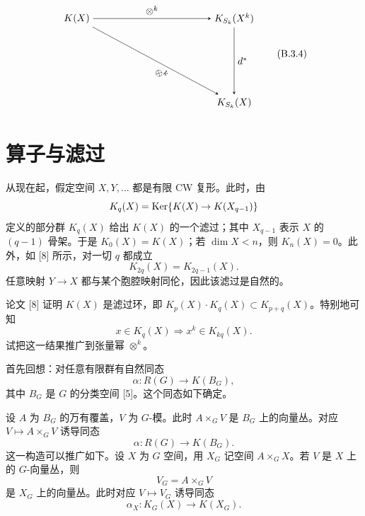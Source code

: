 \begin{equation}
  \begin{tikzpicture}[>=stealth, baseline=(current bounding box.center)]
    \node (A) at (2.0,1.5) {$K(X)$};
    \node (B) at (7.6,1.5) {$K_{S_k}(X^k)$};
    \node (C) at (7.6,-1.5) {$K_{S_k}(X)$};
    \draw[->] (A) -- node[above] {$\otimes^k$} (B);
    \draw[->] (B) -- node[right] {$d^*$} (C);
    \draw[->] (A) -- node[below, sloped, pos=0.58] {$\otimes^k$} (C);
  \end{tikzpicture}
  \tag{B.3.4}
\end{equation}

\section{算子与滤过}

从现在起，假定空间 $X,Y,\dots$ 都是有限 CW 复形。此时，由
\[
  K_q(X)=\operatorname{Ker}\{K(X)\to K(X_{q-1})\}
\]
定义的部分群 $K_q(X)$ 给出 $K(X)$ 的一个滤过；其中 $X_{q-1}$ 表示 $X$ 的 $(q-1)$ 骨架。于是 $K_0(X)=K(X)$；若 $\dim X<n$，则 $K_n(X)=0$。此外，如 [8] 所示，对一切 $q$ 都成立
\[
  K_{2q}(X)=K_{2q-1}(X).
\]
任意映射 $Y\to X$ 都与某个胞腔映射同伦，因此该滤过是自然的。


论文 [8] 证明 $K(X)$ 是滤过环，即 $K_p(X)\cdot K_q(X)\subset K_{p+q}(X)$。特别地可知
\[
  x\in K_q(X)\Rightarrow x^k\in K_{kq}(X).
\]
试把这一结果推广到张量幂 $\otimes^k$。

首先回想：对任意有限群有自然同态
\[
  \alpha\colon R(G)\to K(B_G),
\]
其中 $B_G$ 是 $G$ 的分类空间 [5]。这个同态如下确定。

设 $A$ 为 $B_G$ 的万有覆盖，$V$ 为 $G$-模。此时 $A\times_G V$ 是 $B_G$ 上的向量丛。对应 $V\mapsto A\times_G V$ 诱导同态
\[
  \alpha\colon R(G)\to K(B_G).
\]
这一构造可以推广如下。设 $X$ 为 $G$ 空间，用 $X_G$ 记空间 $A\times_G X$。若 $V$ 是 $X$ 上的 $G$-向量丛，则
\[
  V_G=A\times_G V
\]
是 $X_G$ 上的向量丛。此时对应 $V\mapsto V_G$ 诱导同态
\[
  \alpha_X\colon K_G(X)\to K(X_G).
\]

